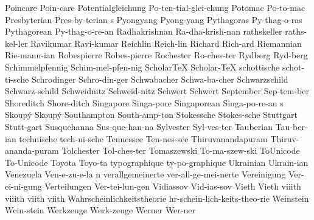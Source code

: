 \1 Poincare		Poin-care
\1 Potentialgleichung	Po-ten-tial-glei-chung
\1 Potomac		Po-to-mac		%
\5 Presbyterian		Pres-by-terian s	%
\1 Pyongyang		Pyong-yang		%
\1 Pythagoras		Py-thag-o-ras		%
\1 Pythagorean		Py-thag-o-re-an		%
\1 Radhakrishnan	Ra-dha-krish-nan   %
\1 rathskeller		raths-kel-ler
\1 Ravikumar		Ravi-kumar		%
\1 Reichlin		Reich-lin		%
\NewWordtrue
\1 Richard		Rich-ard 		%
\1 Riemannian		Rie-mann-ian
\1 Robespierre		Robes-pierre		%
\NewWordtrue
\1 Rochester		Ro-ches-ter		%
\1 Rydberg		Ryd-berg
\1 Schimmelpfennig	Schim-mel-pfen-nig	%
\NewWordtrue
\1 ScholarTeX		Scholar-TeX \thinspace*	%
\1 schottische		schot-ti-sche
\1 Schrodinger		Schro-din-ger
\1 Schwabacher		Schwa-ba-cher
\1 Schwarzschild	Schwarz-schild
\1 Schweidnitz		Schweid-nitz		%
\1 Schwert		Schwert			%
\1 September		Sep-tem-ber
\1 Shoreditch		Shore-ditch		%
\NewWordtrue
\1 Singapore		Singa-pore		%
\NewWordtrue
\5 Singaporean		Singa-po-re-an s	%
\1 Skoup\'y		Skoup\'y		%
\NewWordtrue
\1 Southampton		South-amp-ton		%
\1 Stokessche		Stokes-sche
\1 Stuttgart		Stutt-gart
\1 Susquehanna		Sus-que-han-na
\NewWordtrue
\1 Sylvester		Syl-ves-ter		%
\1 Tauberian		Tau-ber-ian     	%
\1 technische		tech-ni-sche
\1 Tennessee		Ten-nes-see
\1 Thiruvanandapuram	Thiruv-ananda-puram	%
\1 Tolchester		Tol-ches-ter		%
\1 Tomaszewski		To-ma-szew-ski		%
\NewWordtrue
\1 ToUnicode		To-Unicode		%
\1 Toyota		Toyo-ta			%
\1 typographique	ty-po-graphique 	%
\1 Ukrainian		Ukrain-ian
\5 Venezuela		Ven-e-zu-e-la n		%
\1 verallgemeinerte	ver-all-ge-mei-nerte
\1 Vereinigung		Ver-ei-ni-gung
\1 Verteilungen 	Ver-tei-lun-gen
\1 Vidiassov		Vid-ias-sov		%
\1 Vieth		Vieth			%
\1 viiith		viiith			%
\1 viith		viith			%
\1 Wahrscheinlichkeitstheorie  hr-schein-lich-keits-theo-rie
\1 Weinstein		Wein-stein		%
\1 Werkzeuge		Werk-zeuge		%
\1 Werner		Wer-ner		%
